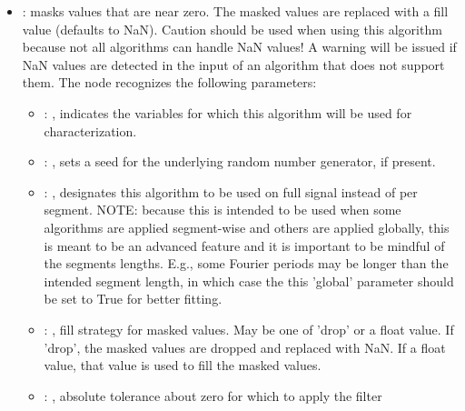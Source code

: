 \begin{itemize}
\begin{itemize}
        \item {}: ,
          the number of wavelet decomposition levels for requested for the signal. This is
          equivalent to                     the number of sets of detail coefficients produced. Note
          that there will always be one set of                     approximation cofficients
          produced, which is treated as a trend in the signal. Note that there is a
          maximum decomposition level depending on signal length and the chosen wavelet family: if
          desired                     level is larger than the maximum decomposition level, the
          latter will be used. Provided level must                     be nonzero.
      \end{itemize}

    \item {}:
      masks values that are near zero. The masked values are replaced with a fill     value
      (defaults to NaN). Caution should be used when using this algorithm because not all algorithms
      can handle NaN values! A warning will be issued if NaN values are detected in the input of an
      algorithm     that does not support them.
      The  node recognizes the following parameters:
        \begin{itemize}
          \item {}: ,
            indicates the variables for which this algorithm will be used for characterization.
          \item {}: ,
            sets a seed for the underlying random number generator, if present.
          \item {}: ,
            designates this algorithm to be used on full signal instead of per
            segment. NOTE: because this is intended to be used when some algorithms are
            applied segment-wise and others are applied globally, this is meant to be an
            advanced feature and it is important to be mindful of the segments lengths.
            E.g., some Fourier periods may be longer than the intended segment length, in
            which case the this 'global' parameter should be set to True for better
            fitting. 
          \item {}: ,
            fill strategy for masked values. May be one of 'drop' or a float value.
            If 'drop', the masked values are dropped and replaced with NaN. If a float value,
            that value is used to fill the masked values. 
          \item {}: ,
            absolute tolerance about zero for which to apply the filter 
      \end{itemize}


\end{itemize}
